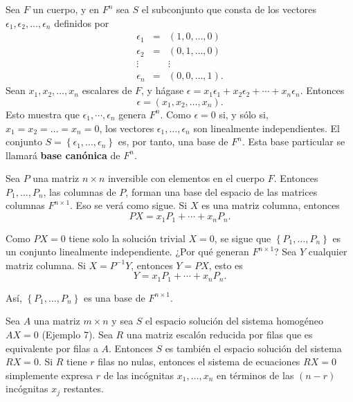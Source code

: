 \setcounter{ejem}{12}
\begin{ejem}
    Sea $F$ un cuerpo, y en $F^n$ sea $S$ el subconjunto que consta de los vectores $\epsilon_1,\epsilon_2,\ldots,\epsilon_n$ definidos por
    $$
    \begin{array}{ccc}
	\epsilon_1&=&(1,0,\ldots,0)\\
	\epsilon_2&=&(0,1,\ldots,0)\\
	\vdots&&\vdots\\
	\epsilon_n&=&(0,0,\ldots,1).
    \end{array}
    $$
    Sean $x_1,x_2,\ldots,x_n$ escalares de $F$, y hágase $\epsilon=x_1\epsilon_1+x_2\epsilon_2+\cdots+x_n\epsilon_n$. Entonces
    $$\epsilon=(x_1,x_2,\ldots,x_n).$$
    Esto muestra que $\epsilon_1,\cdots,\epsilon_n$ genera $F^n$. Como $\epsilon=0$ si, y sólo si, $x_1=x_2=\ldots = x_n=0$, los vectores $\epsilon_1,\ldots,\epsilon_n$ son linealmente independientes. El conjunto $S=\left\{\epsilon_1,\ldots,\epsilon_n\right\}$ es, por tanto, una base de $F^n$. Esta base particular se llamará \textbf{base canónica} de $F^n$.

\end{ejem}


\begin{ejem}
    Sea $P$ una matriz $n\times n$ inversible con elementos en el cuerpo $F$. Entonces $P_1,\ldots,P_n$, las columnas de $P$, forman una base del espacio de las matrices columnas $F^{n\times 1}$. Eso se verá como sigue. Si $X$ es una matriz columna, entonces 
    $$PX=x_1P_1+\cdots + x_nP_n.$$

    Como $PX=0$ tiene solo la solución trivial $X=0$, se sigue que $\left\{P_1,\ldots,P_n\right\}$ es un conjunto linealmente independiente. ¿Por qué generan $F^{n\times 1}$? Sea $Y$ cualquier matriz columna. Si $X=P^{-1}Y$, entonces $Y=PX$, esto es
    $$Y=x_1P_1+\cdots + x_nP_n.$$

    Así, $\left\{P_1,\ldots,P_n\right\}$ es una base de $F^{n\times 1}$.
\end{ejem}

\begin{ejem}
    Sea $A$ una matriz $m\times n$ y sea $S$ el espacio solución del sistema homogéneo $AX=0$ (Ejemplo 7). Sea $R$ una matriz escalón reducida por filas que es equivalente por filas a $A$. Entonces $S$ es también el espacio solución del sistema $RX=0$. Si $R$ tiene $r$ filas no nulas, entonces el sistema de ecuaciones $RX=0$ simplemente expresa $r$ de las incógnitas $x_1,\ldots,x_n$ en términos de las $(n-r)$ incógnitas $x_j$ restantes. 
\end{ejem}

